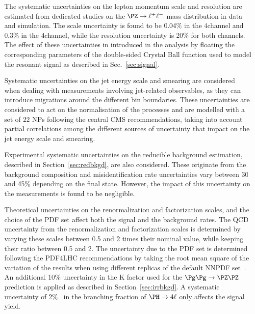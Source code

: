 { The systematic uncertainties on the lepton momentum scale and resolution are estimated from dedicated studies on the $\Zll$ mass distribution in data and simulation.
The scale uncertainty is found to be 0.04\% in the 4\Pgm channel and 0.3\% in the 4\Pe channel, while the resolution uncertainty is 20\% for both channels.
The effect of these uncertainties in introduced in the analysis by floating the corresponding parameters of the double-sided Crystal Ball function used to model the resonant signal as described in Sec.~\ref{sec:signal}.\par} 

Systematic uncertainties on the jet energy scale and smearing are considered when dealing with measurements involving jet-related observables, as they can introduce migrations around the different bin boundaries.
These uncertainties are considered to act on the normalisation of the processes and are modelled with a set of 22 NPs following the central CMS recommendations, taking into account partial correlations among the different sources of uncertainty that impact on the jet energy scale and smearing.


Experimental systematic uncertainties on the reducible background estimation, described in Section~\ref{sec:redbkgd}, are also considered.
These originate from the background composition and misidentification rate uncertainties vary between 30 and 45\% depending on the final state.
However, the impact of this uncertainty on the measurements is found to be negligible.

Theoretical uncertainties on the renormalization and factorization scales, and the choice of the PDF set affect both the signal and the background rates.
The QCD uncertainty from the renormalization and factorization scales is determined by varying these scales between 0.5 and 2 times their nominal value, while keeping their ratio between 0.5 and 2.
The uncertainty due to the PDF set is determined following the PDF4LHC recommendations by taking the root mean square of the variation of the results when using different replicas of the default NNPDF set~\cite{Botje:2011sn,Alekhin:2011sk}.
An additional 10\% uncertainty in the K factor used for the $\ggZZ$ prediction is applied as described in Section~\ref{sec:irrbkgd}.
A systematic uncertainty of 2\%~\cite{deFlorian:2016spz} in the branching fraction of $\Hllll$ only affects the signal yield.

